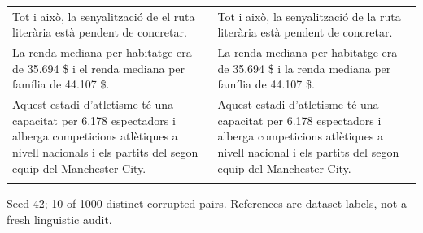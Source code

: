 \documentclass[10pt]{article}
\begin{document}
{\begin{tabular}{@{}>{\raggedright\arraybackslash}p{}@{\hspace{0.04\textwidth}}>{\raggedright\arraybackslash}p{}@{}}
Tot i això, la senyalització de el ruta literària està pendent de concretar. & Tot i això, la senyalització de la ruta literària està pendent de concretar. \\ \addlinespace[5pt]
La renda mediana per habitatge era de 35.694 \$ i el renda mediana per família de 44.107 \$. & La renda mediana per habitatge era de 35.694 \$ i la renda mediana per família de 44.107 \$. \\ \addlinespace[5pt]
Aquest estadi d'atletisme té una capacitat per 6.178 espectadors i alberga competicions atlètiques a nivell nacionals i els partits del segon equip del Manchester City. & Aquest estadi d'atletisme té una capacitat per 6.178 espectadors i alberga competicions atlètiques a nivell nacional i els partits del segon equip del Manchester City. \\ \addlinespace[5pt]
\bottomrule\end{tabular}}%
\ifdim\dimexpr\ht\pairtable+\dp\pairtable\relax>0.82\textheight%
\resizebox*{!}{0.82\textheight}{\usebox{\pairtable}}%
\else\usebox{\pairtable}\fi%
\par\smallskip\footnotesize Seed 42; 10 of 1000 distinct corrupted pairs. References are dataset labels, not a fresh linguistic audit.\normalsize
\clearpage
\end{document}
